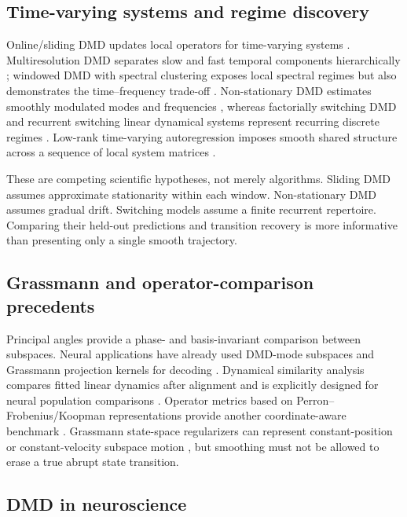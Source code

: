 \documentclass[11pt,a4paper]{article}
\begin{document}
\subsection{Time-varying systems and regime discovery}

Online/sliding DMD updates local operators for time-varying systems \citep{zhang2019online}. Multiresolution DMD separates slow and fast temporal components hierarchically \citep{kutz2016mrdmd}; windowed DMD with spectral clustering exposes local spectral regimes but also demonstrates the time--frequency trade-off \citep{dylewsky2019}. Non-stationary DMD estimates smoothly modulated modes and frequencies \citep{ferre2023}, whereas factorially switching DMD and recurrent switching linear dynamical systems represent recurring discrete regimes \citep{takeishi2018switching,linderman2017}. Low-rank time-varying autoregression imposes smooth shared structure across a sequence of local system matrices \citep{harris2021}.

These are competing scientific hypotheses, not merely algorithms. Sliding DMD assumes approximate stationarity within each window. Non-stationary DMD assumes gradual drift. Switching models assume a finite recurrent repertoire. Comparing their held-out predictions and transition recovery is more informative than presenting only a single smooth trajectory.

\subsection{Grassmann and operator-comparison precedents}

Principal angles provide a phase- and basis-invariant comparison between subspaces. Neural applications have already used DMD-mode subspaces and Grassmann projection kernels for decoding \citep{shiraishi2020,fukuma2024}. Dynamical similarity analysis compares fitted linear dynamics after alignment and is explicitly designed for neural population comparisons \citep{ostrow2023}. Operator metrics based on Perron--Frobenius/Koopman representations provide another coordinate-aware benchmark \citep{ishikawa2018,zhang2025koopstd}. Grassmann state-space regularizers can represent constant-position or constant-velocity subspace motion \citep{saadfalcon2024}, but smoothing must not be allowed to erase a true abrupt state transition.

\subsection{DMD in neuroscience}
\end{document}
